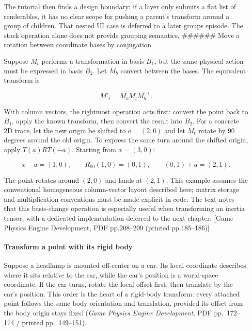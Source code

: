 The tutorial then finds a design boundary: if a layer only submits a flat list of renderables, it has no clear scope for pushing a parent's transform around a group of children. That nested UI case is deferred to a later groups episode. The stack operation alone does not provide grouping semantics. \#\#\#\#\#\# Move a rotation between coordinate bases by conjugation

Suppose \(M_t\) performs a transformation in basis \(B_1\), but the same physical action must be expressed in basis \(B_2\). Let \(M_b\) convert between the bases. The equivalent transform is

\[
M'_t=M_bM_tM_b^{-1}.
\]

With column vectors, the rightmost operation acts first: convert the point back to \(B_1\), apply the known transform, then convert the result into \(B_2\). For a concrete 2D trace, let the new origin be shifted to \(a=(2,0)\) and let \(M_t\) rotate by 90 degrees around the old origin. To express the same turn around the shifted origin, apply \(T(a)RT(-a)\). Starting from \(x=(3,0)\):

\[
x-a=(1,0),\qquad R_{90}(1,0)=(0,1),\qquad (0,1)+a=(2,1).
\]

The point rotates around \((2,0)\) and lands at \((2,1)\). This example assumes the conventional homogeneous column-vector layout described here; matrix storage and multiplication conventions must be made explicit in code. The text notes that this basis-change operation is especially useful when transforming an inertia tensor, with a dedicated implementation deferred to the next chapter. {[}Game Physics Engine Development, PDF pp.208--209 (printed pp.185--186){]}

\paragraph{Transform a point with its rigid body}\label{06-engine-ii-ch025-transform-a-point-with-its-rigid-body}

Suppose a headlamp is mounted off-center on a car. Its local coordinate describes where it sits relative to the car, while the car's position is a world-space coordinate. If the car turns, rotate the local offset first; then translate by the car's position. This order is the heart of a rigid-body transform: every attached point follows the same body orientation and translation, provided its offset from the body origin stays fixed (\emph{Game Physics Engine Development}, PDF pp.~172--174 / printed pp.~149--151).

